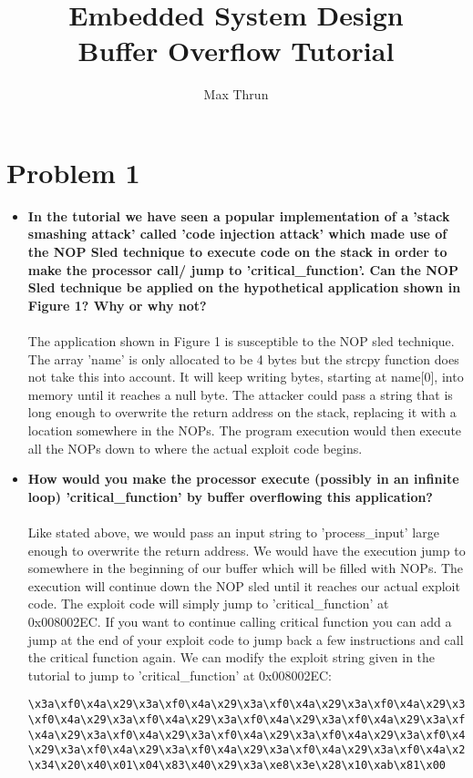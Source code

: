 \documentclass[11pt]{article}
\title{Embedded System Design \\ Buffer Overflow Tutorial}
\author{ Max Thrun }
\begin{document}
\maketitle

\section*{Problem 1}
\begin{itemize}
    \item \textbf{
            In the tutorial we have seen a popular implementation of a 
            'stack smashing attack' called 'code injection attack' which 
            made use of the NOP Sled technique to execute code on the stack 
            in order to make the processor call/ jump to 'critical\_function'. 
            Can the NOP Sled technique be applied on the hypothetical 
            application shown in Figure 1? Why or why not?
        }\\\\
        The application shown in Figure 1 is susceptible to the NOP sled
        technique. The array 'name' is only allocated to be 4 bytes but the
        strcpy function does not take this into account. It will keep writing
        bytes, starting at name[0], into memory until it reaches a null byte.
        The attacker could pass a string that is long enough to overwrite the
        return address on the stack, replacing it with a location somewhere
        in the NOPs. The program execution would then execute all the NOPs
        down to where the actual exploit code begins.
    \item \textbf{
            How would you make the processor execute (possibly in an 
            infinite loop) 'critical\_function' by buffer overflowing this 
            application? 
        }\\\\
        Like stated above, we would pass an input string to 'process\_input'
        large enough to overwrite the return address. We would have the
        execution jump to somewhere in the beginning of our buffer which
        will be filled with NOPs. The execution will continue down the NOP
        sled until it reaches our actual exploit code. The exploit code will
        simply jump to 'critical\_function' at 0x008002EC. If you want to 
        continue calling critical function you can add a jump at the end of 
        your exploit code to jump back a few instructions and call the 
        critical function again. We can modify the exploit string given in the
        tutorial to jump to 'critical\_function' at 0x008002EC:
        \begin{verbatim}
\x3a\xf0\x4a\x29\x3a\xf0\x4a\x29\x3a\xf0\x4a\x29\x3a\xf0\x4a\x29\x3a\xf0\x4a\x29\x3a
\xf0\x4a\x29\x3a\xf0\x4a\x29\x3a\xf0\x4a\x29\x3a\xf0\x4a\x29\x3a\xf0\x4a\x29\x3a\xf0
\x4a\x29\x3a\xf0\x4a\x29\x3a\xf0\x4a\x29\x3a\xf0\x4a\x29\x3a\xf0\x4a\x29\x3a\xf0\x4a
\x29\x3a\xf0\x4a\x29\x3a\xf0\x4a\x29\x3a\xf0\x4a\x29\x3a\xf0\x4a\x29\x3a\xf0\x4a\x29
\x34\x20\x40\x01\x04\x83\x40\x29\x3a\xe8\x3e\x28\x10\xab\x81\x00
        \end{verbatim}
\end{itemize}
\end{document}
